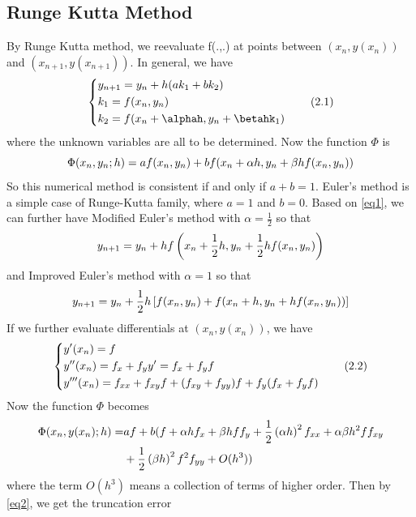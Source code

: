 \documentclass[
11pt, %
a4paper, %
oneside, %
headinclude,footinclude, %
BCOR5mm, %
]{scrartcl}
\begin{document}
\subsection{Runge Kutta Method}
By Runge Kutta method, we reevaluate f(.,.) at points between $(x_n,y(x_n))$ and $(x_{n+1},y(x_{n+1}))$. In general, we have
\begin{equation}
\label{eq1}
\centering
\left\{\begin{split}
&y_{n+1}=y_n+h(ak_1+bk_2) \\
&k_1=f(x_n,y_n)\\
&k_2=f(x_n+\alphah,y_n+\betahk_1)
\end{split}\right.\tag{2.1}
\end{equation}
where the unknown variables are all to be determined. Now the function $\Phi$ is
\begin{equation}
     \Phi(x_n,y_n;h)=af(x_n,y_n)+bf(x_n+\alpha h,y_n+\beta hf(x_n,y_n)) \notag
\end{equation} 
So this numerical method is consistent if and only if $a+b=1$. Euler's method is a simple case of Runge-Kutta family, where $a=1$ and $b=0$. Based on \vref{eq1}, we can further have Modified Euler's method with $\alpha=\frac{1}{2}$ so that 
\begin{equation}
    y_{n+1}=y_n+hf\left(x_n+\frac{1}{2}h,y_n+\frac{1}{2}hf(x_n,y_n)\right) \notag
\end{equation}
and Improved Euler's method with $\alpha=1$ so that 
\begin{equation}
    y_{n+1}=y_n+\frac{1}{2}h\left[f(x_n,y_n)+f(x_n+h,y_n+hf(x_n,y_n))\right] \notag
\end{equation}
If we further evaluate differentials at $(x_n,y(x_n))$, we have
\begin{equation}
\label{eq2}
\centering
\left\{\begin{split}
&y'(x_n)=f \\
&y''(x_n)=f_x+f_yy'=f_x+f_yf\\
&y'''(x_n)=f_{xx}+f_{xy}f+(f_{xy}+f_{yy})f+f_y(f_x+f_yf)
\end{split}\right.\tag{2.2}
\end{equation}
Now the function $\Phi$ becomes 
\begin{align}
\Phi(x_n,y(x_n);h)=&af+b(f+\alpha hf_x+\beta hff_y+\frac{1}{2}\left(\alpha h\right)^2f_{xx}+\alpha \beta h^2ff_{xy}\notag \\ 
&+\frac{1}{2}\left(\beta h\right)^2f^2f_{yy}+O(h^3)) \notag    
\end{align}
where the term $O(h^3)$ means a collection of terms of higher order. Then by \vref{eq2}, we get the truncation error 
\end{document}
